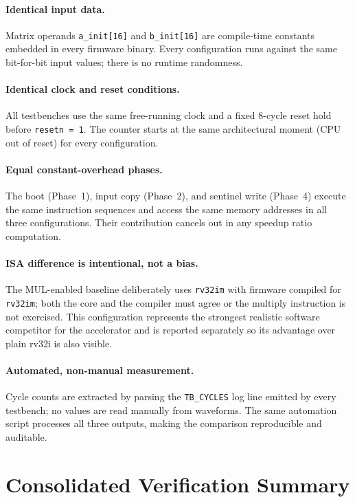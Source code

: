 ﻿\documentclass[12pt,a4paper]{report}
\begin{document}
\paragraph{Identical input data.}
Matrix operands \texttt{a\_init[16]} and \texttt{b\_init[16]} are compile-time
constants embedded in every firmware binary.
Every configuration runs against the same bit-for-bit input values;
there is no runtime randomness.

\paragraph{Identical clock and reset conditions.}
All testbenches use the same free-running clock and a fixed 8-cycle reset
hold before \texttt{resetn = 1}.
The counter starts at the same architectural moment (CPU out of reset) for
every configuration.

\paragraph{Equal constant-overhead phases.}
The boot (Phase~1), input copy (Phase~2), and sentinel write (Phase~4)
execute the same instruction sequences and access the same memory addresses
in all three configurations.
Their contribution cancels out in any speedup ratio computation.

\paragraph{ISA difference is intentional, not a bias.}
The MUL-enabled baseline deliberately uses \texttt{rv32im} with firmware
compiled for \texttt{rv32im}; both the core and the compiler must agree or
the multiply instruction is not exercised.
This configuration represents the strongest realistic software competitor
for the accelerator and is reported separately so its advantage over plain
rv32i is also visible.

\paragraph{Automated, non-manual measurement.}
Cycle counts are extracted by parsing the \texttt{TB\_CYCLES} log line emitted
by every testbench; no values are read manually from waveforms.
The same automation script processes all three outputs, making the comparison
reproducible and auditable.

\section{Consolidated Verification Summary}
\end{document}
